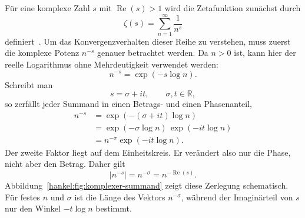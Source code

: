 Für eine komplexe Zahl $s$ mit $\operatorname{Re}(s)>1$ wird die Zetafunktion zunächst durch
\begin{equation}
\zeta(s)
=
\sum_{n=1}^{\infty}
\frac{1}{n^s}
\label{hankel:eq:dirichlet}
\end{equation}
definiert~\cite{hankel:apostol}. 
Um das Konvergenzverhalten dieser Reihe zu verstehen, muss zuerst die komplexe Potenz $n^{-s}$ genauer betrachtet werden. Da $n>0$ ist, kann hier der reelle Logarithmus ohne Mehrdeutigkeit verwendet werden:
\begin{equation}
n^{-s}
=
\exp(-s\log n).
\label{hankel:eq:komplexe-potenz}
\end{equation}
Schreibt man
\begin{equation}
s=\sigma+it,
\qquad
\sigma,t\in\mathbb{R},
\label{hankel:eq:sigma-it}
\end{equation}
so zerfällt jeder Summand in einen Betrags- und einen Phasenanteil,
\begin{equation}
\begin{aligned}
n^{-s}
&=
\exp(- (\sigma+it)\log n)
\\
&=
\exp(-\sigma\log n)\,
\exp(-it\log n)
\\
&=
n^{-\sigma}\exp(-it\log n).
\end{aligned}
\label{hankel:eq:potenz-zerlegung}
\end{equation}
Der zweite Faktor liegt auf dem Einheitskreis. 
Er verändert also nur die Phase, nicht aber den Betrag. 
Daher gilt
\begin{equation}
|n^{-s}|
=
n^{-\sigma}
=
n^{-\operatorname{Re}(s)}.
\label{hankel:eq:betrag-potenz}
\end{equation}
Abbildung~\ref{hankel:fig:komplexer-summand} zeigt diese Zerlegung schematisch. 
Für festes $n$ und $\sigma$ ist die Länge des Vektors
$n^{-\sigma}$, während der Imaginärteil von $s$ nur den Winkel
$-t\log n$ bestimmt.


%

